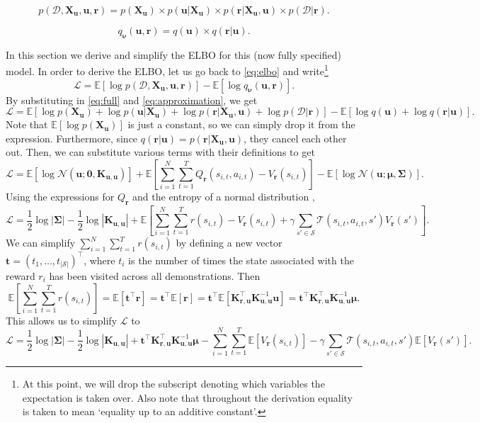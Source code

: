 \documentclass{article}
\theoremstyle{definition}
\theoremstyle{remark}
\newcommand{\pfull}{p(\mathcal{D}, \mathbf{X_u}, \mathbf{u}, \mathbf{r})}
\newcommand{\approximation}{q_{\bm\nu}(\mathbf{u}, \mathbf{r})}
\newcommand{\Kuu}{\mathbf{K}_{\mathbf{u},\mathbf{u}}}
\newcommand{\Kru}{\mathbf{K}_{\mathbf{r},\mathbf{u}}}
\newcommand{\V}{V_{\mathbf{r}}}
\begin{document}
\begin{equation} \label{eq:full}
  \pfull = p(\mathbf{X_u}) \times p(\mathbf{u} | \mathbf{X_u}) \times p(\mathbf{r} | \mathbf{X_u}, \mathbf{u}) \times p(\mathcal{D} | \mathbf{r}).
\end{equation}

\begin{equation} \label{eq:approximation}
  \approximation = q(\mathbf{u}) \times q(\mathbf{r} | \mathbf{u}).
\end{equation}

In this section we derive and simplify the ELBO for this (now fully specified)
model. In order to derive the ELBO, let us go back to \eqref{eq:elbo} and
write\footnote{At this point, we will drop the subscript denoting which
  variables the expectation is taken over. Also note that throughout the
  derivation equality is taken to mean `equality up to an additive constant'.}
\[
  \mathcal{L} = \mathbb{E}[\log\pfull] - \mathbb{E}[\log\approximation].
\]
By substituting in \eqref{eq:full} and \eqref{eq:approximation}, we get
\[
  \mathcal{L} = \mathbb{E}[\log p(\mathbf{X_u}) + \log p(\mathbf{u} |
  \mathbf{X_u}) + \log p(\mathbf{r} | \mathbf{X_u}, \mathbf{u}) + \log
  p(\mathcal{D} | \mathbf{r})] - \mathbb{E}[\log q(\mathbf{u}) + \log
  q(\mathbf{r} | \mathbf{u})].
\]
Note that $\mathbb{E}[\log p(\mathbf{X_u})]$ is just a constant, so we can
simply drop it from the expression. Furthermore, since $q(\mathbf{r} |
\mathbf{u}) = p(\mathbf{r} | \mathbf{X_u}, \mathbf{u})$, they cancel each other
out. Then, we can substitute various terms with their definitions to get
\[
  \mathcal{L} = \mathbb{E}[\log \mathcal{N}(\mathbf{u}; \mathbf{0}, \Kuu)] +
  \mathbb{E}\left[ \sum_{i=1}^N \sum_{t=1}^T Q_{\mathbf{r}}(s_{i,t}, a_{i,t}) -
    \V(s_{i,t}) \right] - \mathbb{E}[\log\mathcal{N}(\mathbf{u}; \bm\mu,
  \bm\Sigma)].
\]
Using the expressions for $Q_{\mathbf{r}}$ and the entropy of a normal
distribution \cite{DBLP:journals/tit/AhmedG89},
\[
  \mathcal{L} = \frac{1}{2}\log|\bm\Sigma| - \frac{1}{2}\log|\Kuu| +
  \mathbb{E}\left[\sum_{i=1}^N \sum_{t=1}^T r(s_{i,t}) - \V(s_{i,t}) +
    \gamma\sum_{s' \in \mathcal{S}} \mathcal{T}(s_{i,t}, a_{i,t}, s')\V(s')
  \right].
\]
We can simplify $\sum_{i=1}^N\sum_{t=1}^Tr(s_{i,t})$ by defining a new vector
$\mathbf{t} = (t_1, \dots, t_{|\mathcal{S}|})^\intercal$, where $t_i$ is the
number of times the state associated with the reward $r_i$ has been visited
across all demonstrations. Then
\[
  \mathbb{E} \left[ \sum_{i=1}^N\sum_{t=1}^Tr(s_{i,t}) \right] =
  \mathbb{E}[\mathbf{t}^\intercal\mathbf{r}] =
  \mathbf{t}^\intercal\mathbb{E}[\mathbf{r}] =
  \mathbf{t}^\intercal\mathbb{E}\left[\Kru^\intercal\Kuu^{-1}\mathbf{u}\right] =
  \mathbf{t}^\intercal\Kru^\intercal\Kuu^{-1}\bm\mu.
\]
This allows us to simplify $\mathcal{L}$ to
\[
  \mathcal{L} = \frac{1}{2}\log|\bm\Sigma| - \frac{1}{2}\log|\Kuu| +
  \mathbf{t}^\intercal\Kru^\intercal\Kuu^{-1}\bm\mu - \sum_{i=1}^N \sum_{t=1}^T
  \mathbb{E}[\V(s_{i,t})] - \gamma\sum_{s' \in \mathcal{S}}
  \mathcal{T}(s_{i,t}, a_{i,t}, s')\mathbb{E}[\V(s')].
\]
\end{document}
